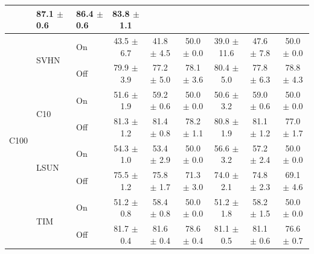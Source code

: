 \documentclass{article}
\begin{document}
\begin{table}[H]
\begin{center}
\begin{small}
\begin{tabular}{ l l l | c c c | c c c }
    & 87.1 {\tiny $\pm$ 0.6} & 86.4 {\tiny $\pm$ 0.6} & 83.8 {\tiny $\pm$ 1.1} \\
    \midrule
    \multirow{8}{*}{C100} & \multirow{2}{*}{SVHN} %
    & On
    & 43.5 {\tiny $\pm$ 6.7}  & 41.8 {\tiny $\pm$ 4.5} & 50.0 {\tiny $\pm$ 0.0}
    & 39.0 {\tiny $\pm$ 11.6} & 47.6 {\tiny $\pm$ 7.8} & 50.0 {\tiny $\pm$ 0.0} \\
    & & Off
    & 79.9 {\tiny $\pm$ 3.9} & 77.2 {\tiny $\pm$ 5.0} & 78.1 {\tiny $\pm$ 3.6}
    & 80.4 {\tiny $\pm$ 5.0} & 77.8 {\tiny $\pm$ 6.3} & 78.8 {\tiny $\pm$ 4.3} \\
    \cmidrule[0.5pt](lr){2-9}
    & \multirow{2}{*}{C10} %
    & On
    & 51.6 {\tiny $\pm$ 1.9} & 59.2 {\tiny $\pm$ 0.6} & 50.0 {\tiny $\pm$ 0.0}
    & 50.6 {\tiny $\pm$ 3.2} & 59.0 {\tiny $\pm$ 0.6} & 50.0 {\tiny $\pm$ 0.0} \\
    & & Off
    & 81.3 {\tiny $\pm$ 1.2} & 81.4 {\tiny $\pm$ 0.8} & 78.2 {\tiny $\pm$ 1.1}
    & 80.8 {\tiny $\pm$ 1.9} & 81.1 {\tiny $\pm$ 1.2} & 77.0 {\tiny $\pm$ 1.7} \\
    \cmidrule[0.5pt](lr){2-9}
    & \multirow{2}{*}{LSUN} %
    & On
    & 54.3 {\tiny $\pm$ 1.0} & 53.4 {\tiny $\pm$ 2.9} & 50.0 {\tiny $\pm$ 0.0}
    & 56.6 {\tiny $\pm$ 3.2} & 57.2 {\tiny $\pm$ 2.4} & 50.0 {\tiny $\pm$ 0.0} \\
    & & Off
    & 75.5 {\tiny $\pm$ 1.2} & 75.8 {\tiny $\pm$ 1.7} & 71.3 {\tiny $\pm$ 3.0}
    & 74.0 {\tiny $\pm$ 2.1} & 74.8 {\tiny $\pm$ 2.3} & 69.1 {\tiny $\pm$ 4.6} \\
    \cmidrule[0.5pt](lr){2-9}
    & \multirow{2}{*}{TIM} %
    & On
    & 51.2 {\tiny $\pm$ 0.8} & 58.4 {\tiny $\pm$ 0.8} & 50.0 {\tiny $\pm$ 0.0}
    & 51.2 {\tiny $\pm$ 1.8} & 58.2 {\tiny $\pm$ 1.5} & 50.0 {\tiny $\pm$ 0.0} \\
    & & Off
    & 81.7 {\tiny $\pm$ 0.4} & 81.6 {\tiny $\pm$ 0.4} & 78.6 {\tiny $\pm$ 0.4}
    & 81.1 {\tiny $\pm$ 0.5} & 81.1 {\tiny $\pm$ 0.6} & 76.6 {\tiny $\pm$ 0.7} \\
    \bottomrule
  \end{tabular}
  \end{small}
  \end{center}
\end{table}
\end{document}
